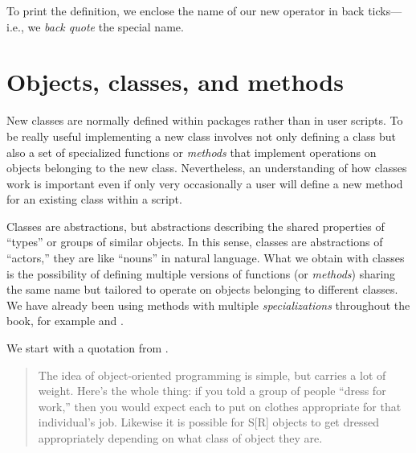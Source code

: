 \documentclass[krantz2]{krantz}\usepackage{knitr}
\begin{document}
\begin{explainbox}
To print the definition, we enclose the name of our new operator in back ticks---i.e., we \emph{back quote} the special name.

\begin{knitrout}\footnotesize
{}\color{fgcolor}
\end{knitrout}

\end{explainbox}

\section{Objects, classes, and methods}\label{sec:script:objects:classes:methods}\label{sec:methods}
New classes are normally defined within packages rather than in user scripts. To be really useful implementing a new class involves not only defining a class but also a set of specialized functions or \emph{methods} that implement operations on objects belonging to the new class. Nevertheless, an understanding of how classes work is important even if only very occasionally a user will define a new method for an existing class within a script.

Classes are abstractions, but abstractions describing the shared properties of ``types'' or groups of similar objects. In this sense, classes are abstractions of ``actors,'' they are like ``nouns'' in natural language. What we obtain with classes is the possibility of defining multiple versions of functions (or \emph{methods}) sharing the same name but tailored to operate on objects belonging to different classes. We have already been using methods with multiple \emph{specializations} throughout the book, for example  and .

We start with a quotation from  \autocite[][, page 13]{Burns1998}.
\begin{quotation}
The idea of object-oriented programming is simple, but carries a lot of weight.
Here's the whole thing: if you told a group of people ``dress for work,'' then
you would expect each to put on clothes appropriate for that individual's job.
Likewise it is possible for S[R] objects to get dressed appropriately depending on
what class of object they are.
\end{quotation}
\end{document}

